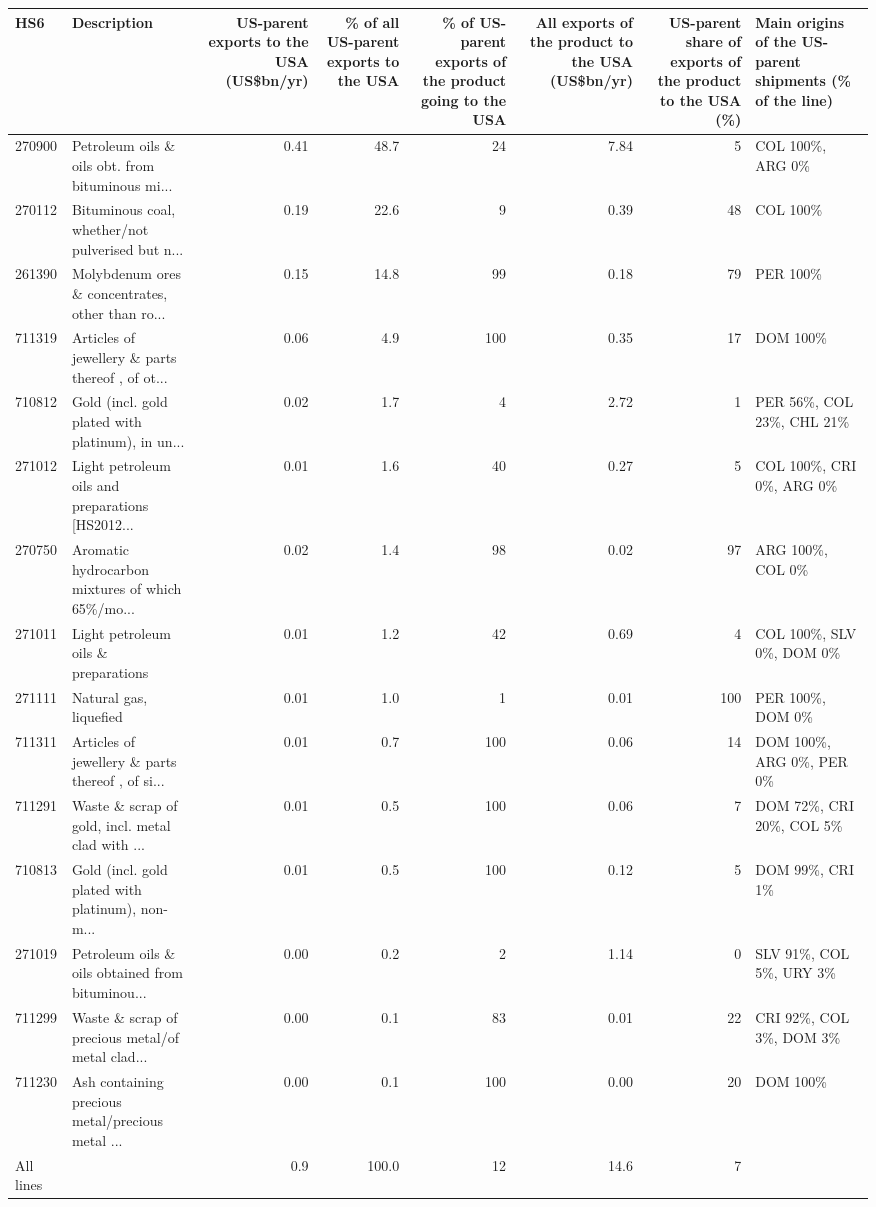 \begin{tabular}{llrrrrrl}
\toprule
HS6 & Description & \multicolumn{1}{p{1.7cm}}{\raggedright US-parent exports to the USA (US\$bn/yr)} & \multicolumn{1}{p{1.7cm}}{\raggedright \% of all US-parent exports to the USA} & \multicolumn{1}{p{2.0cm}}{\raggedright \% of US-parent exports of the product going to the USA} & \multicolumn{1}{p{1.9cm}}{\raggedright All exports of the product to the USA (US\$bn/yr)} & \multicolumn{1}{p{2.2cm}}{\raggedright US-parent share of exports of the product to the USA (\%)} & \multicolumn{1}{p{2.6cm}}{\raggedright Main origins of the US-parent shipments (\% of the line)} \\
\midrule
270900 & Petroleum oils \& oils obt. from bituminous mi... & 0.41 & 48.7 & 24 & 7.84 & 5 & COL 100\%, ARG 0\% \\
270112 & Bituminous coal, whether/not pulverised but n... & 0.19 & 22.6 & 9 & 0.39 & 48 & COL 100\% \\
261390 & Molybdenum ores \& concentrates, other than ro... & 0.15 & 14.8 & 99 & 0.18 & 79 & PER 100\% \\
711319 & Articles of jewellery \& parts thereof , of ot... & 0.06 & 4.9 & 100 & 0.35 & 17 & DOM 100\% \\
710812 & Gold (incl. gold plated with platinum), in un... & 0.02 & 1.7 & 4 & 2.72 & 1 & PER 56\%, COL 23\%, CHL 21\% \\
271012 & Light petroleum oils and preparations [HS2012... & 0.01 & 1.6 & 40 & 0.27 & 5 & COL 100\%, CRI 0\%, ARG 0\% \\
270750 & Aromatic hydrocarbon mixtures of which 65\%/mo... & 0.02 & 1.4 & 98 & 0.02 & 97 & ARG 100\%, COL 0\% \\
271011 & Light petroleum oils \& preparations & 0.01 & 1.2 & 42 & 0.69 & 4 & COL 100\%, SLV 0\%, DOM 0\% \\
271111 & Natural gas, liquefied & 0.01 & 1.0 & 1 & 0.01 & 100 & PER 100\%, DOM 0\% \\
711311 & Articles of jewellery \& parts thereof , of si... & 0.01 & 0.7 & 100 & 0.06 & 14 & DOM 100\%, ARG 0\%, PER 0\% \\
711291 & Waste \& scrap of gold, incl. metal clad with ... & 0.01 & 0.5 & 100 & 0.06 & 7 & DOM 72\%, CRI 20\%, COL 5\% \\
710813 & Gold (incl. gold plated with platinum), non-m... & 0.01 & 0.5 & 100 & 0.12 & 5 & DOM 99\%, CRI 1\% \\
271019 & Petroleum oils \& oils obtained from bituminou... & 0.00 & 0.2 & 2 & 1.14 & 0 & SLV 91\%, COL 5\%, URY 3\% \\
711299 & Waste \& scrap of precious metal/of metal clad... & 0.00 & 0.1 & 83 & 0.01 & 22 & CRI 92\%, COL 3\%, DOM 3\% \\
711230 & Ash containing precious metal/precious metal ... & 0.00 & 0.1 & 100 & 0.00 & 20 & DOM 100\% \\
\midrule
All lines & & 0.9 & 100.0 & 12 & 14.6 & 7 & \\
\bottomrule
\end{tabular}
